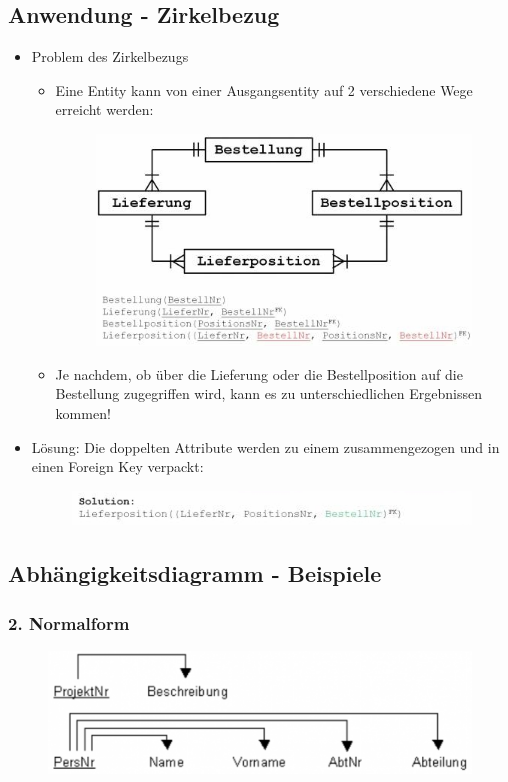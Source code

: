 \subsection{Anwendung - Zirkelbezug}
\begin{itemize}
    \item Problem des Zirkelbezugs
    \begin{itemize}
        \item Eine Entity kann von einer Ausgangsentity auf 2 verschiedene Wege erreicht werden:
        \begin{figure}[H]
            \centering
            \includegraphics[scale=.8]{res/themenkorb_3/zirkelbezug_1.jpg}
        \end{figure}
        \item Je nachdem, ob über die Lieferung oder die Bestellposition auf die Bestellung zugegriffen wird, kann es zu unterschiedlichen Ergebnissen kommen!
    \end{itemize}
    \item Lösung: Die doppelten Attribute werden zu einem zusammengezogen und in einen Foreign Key verpackt:
    \begin{figure}[H]
        \centering
        \includegraphics[scale=.8]{res/themenkorb_3/zirkelbezug_2.jpg}
    \end{figure}
\end{itemize}

\subsection{Abhängigkeitsdiagramm - Beispiele}
\subsubsection{2. Normalform}
\begin{figure}[H]
    \centering
    \includegraphics[width=\textwidth]{res/themenkorb_3/normalization_pic4.png}
\end{figure}
